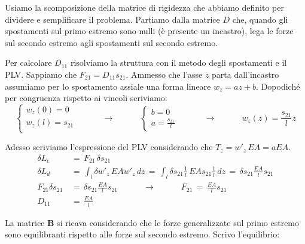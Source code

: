 Usiamo la scomposizione della matrice di rigidezza che abbiamo definito per dividere e semplificare il problema. Partiamo dalla matrice $D$ che, quando gli spostamenti sul primo estremo sono nulli (è presente un incastro), lega le forze sul secondo estremo agli spostamenti sul secondo estremo.\\
\begin{esempioBox}
Per calcolare $D_{11}$ risolviamo la struttura con il metodo degli spostamenti e il PLV. Sappiamo che $F_{21}=D_{11}s_{21}$. Ammesso che l'asse $z$ parta dall'incastro assumiamo per lo spostamento assiale una forma lineare $w_z = az+b$. Dopodiché per congruenza rispetto ai vincoli scriviamo:
\begin{equation*}
    \begin{cases}
        w_z(0 )=0\\
         w_z(l )=s_{21}\\
    \end{cases}
    \quad\quad\quad \rightarrow\quad\quad\quad
        \begin{cases}
            b=0\\
            a = \frac{s_{21}}{l}
        \end{cases}
      \quad\quad\quad \rightarrow\quad\quad\quad
    w_z(z) = \frac{s_{21}}{l}z
\end{equation*}

Adesso scriviamo l'espressione del PLV considerando che $T_z = w'_z \,EA = aEA $.
\begin{align*}
    \delta L_e\,&=\,F_{21}\, \delta s_{21}\\
    \delta L_d\,&=\,\int_l \delta w'_z \,EAw'_z\,dz\, = \,\int_l \delta s_{21} \frac{1}{l}\,EAs_{21} \frac{1}{l}\,dz\, 
    = \,\delta s_{21} \frac{EA}{l}s_{21} \\
    F_{21} \delta s_{21} \,&= \,\delta s_{21} \frac{EA}{l}s_{21} 
    \quad\quad\quad \rightarrow\quad\quad\quad
     F_{21}  \,= \, \frac{EA}{l}s_{21} \\
     D_{11} \,&= \, \frac{EA}{l}
\end{align*}
\end{esempioBox}

La matrice $\boldsymbol{B}$ si ricava considerando che le forze generalizzate sul primo estremo sono equilibranti rispetto alle forze sul secondo estremo. Scrivo l'equilibrio:


